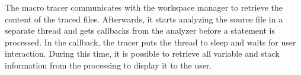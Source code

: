 The macro tracer communicates with the workspace manager to retrieve the content of the traced files. Afterwards, it starts analyzing the source file in a separate thread and gets callbacks from the analyzer before a statement is processed. In the callback, the tracer puts the thread to sleep and waits for user interaction. During this time, it is possible to retrieve all variable and stack information from the processing to display it to the user.
